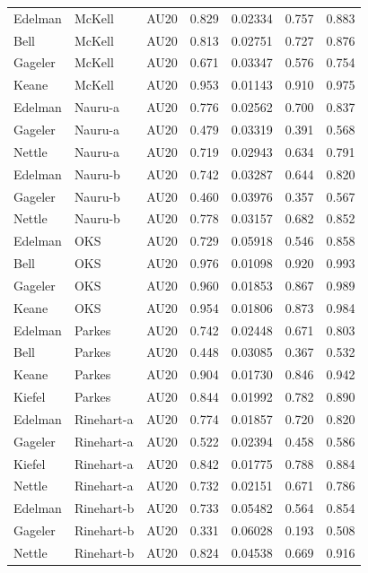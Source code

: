 \documentclass{monashthesis}
\begin{document}
\begin{center}
\begin{longtable}{lllllll}
Edelman & McKell & AU20 & 0.829 & 0.02334 & 0.757 & 0.883 \\
Bell & McKell & AU20 & 0.813 & 0.02751 & 0.727 & 0.876 \\
Gageler & McKell & AU20 & 0.671 & 0.03347 & 0.576 & 0.754 \\
Keane & McKell & AU20 & 0.953 & 0.01143 & 0.910 & 0.975 \\
Edelman & Nauru-a & AU20 & 0.776 & 0.02562 & 0.700 & 0.837 \\
Gageler & Nauru-a & AU20 & 0.479 & 0.03319 & 0.391 & 0.568 \\
Nettle & Nauru-a & AU20 & 0.719 & 0.02943 & 0.634 & 0.791 \\
Edelman & Nauru-b & AU20 & 0.742 & 0.03287 & 0.644 & 0.820 \\
Gageler & Nauru-b & AU20 & 0.460 & 0.03976 & 0.357 & 0.567 \\
Nettle & Nauru-b & AU20 & 0.778 & 0.03157 & 0.682 & 0.852 \\
Edelman & OKS & AU20 & 0.729 & 0.05918 & 0.546 & 0.858 \\
Bell & OKS & AU20 & 0.976 & 0.01098 & 0.920 & 0.993 \\
Gageler & OKS & AU20 & 0.960 & 0.01853 & 0.867 & 0.989 \\
Keane & OKS & AU20 & 0.954 & 0.01806 & 0.873 & 0.984 \\
Edelman & Parkes & AU20 & 0.742 & 0.02448 & 0.671 & 0.803 \\
Bell & Parkes & AU20 & 0.448 & 0.03085 & 0.367 & 0.532 \\
Keane & Parkes & AU20 & 0.904 & 0.01730 & 0.846 & 0.942 \\
Kiefel & Parkes & AU20 & 0.844 & 0.01992 & 0.782 & 0.890 \\
Edelman & Rinehart-a & AU20 & 0.774 & 0.01857 & 0.720 & 0.820 \\
Gageler & Rinehart-a & AU20 & 0.522 & 0.02394 & 0.458 & 0.586 \\
Kiefel & Rinehart-a & AU20 & 0.842 & 0.01775 & 0.788 & 0.884 \\
Nettle & Rinehart-a & AU20 & 0.732 & 0.02151 & 0.671 & 0.786 \\
Edelman & Rinehart-b & AU20 & 0.733 & 0.05482 & 0.564 & 0.854 \\
Gageler & Rinehart-b & AU20 & 0.331 & 0.06028 & 0.193 & 0.508 \\
Nettle & Rinehart-b & AU20 & 0.824 & 0.04538 & 0.669 & 0.916 \\
\end{longtable}
\end{center}
\end{document}
